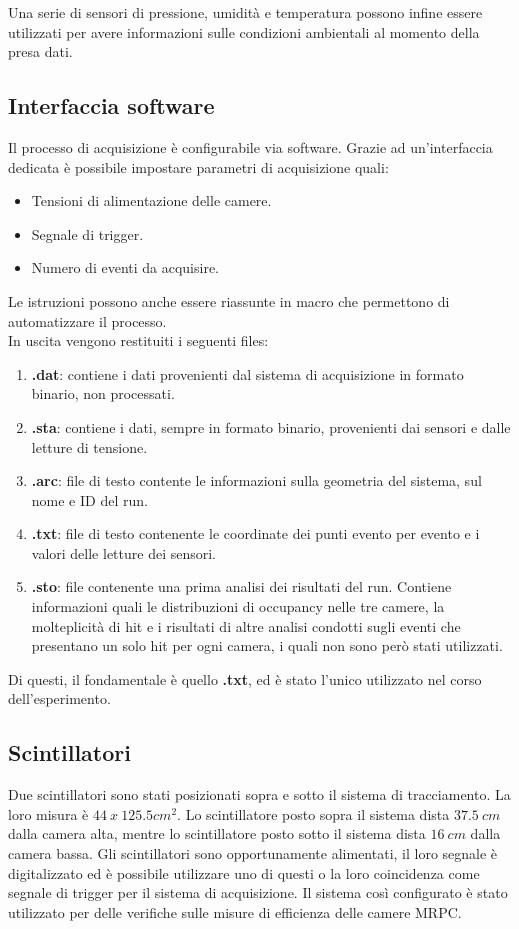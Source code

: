 \documentclass[8pt]{extarticle}
\begin{document}
Una serie di sensori di pressione, umidità e temperatura possono infine essere utilizzati per avere informazioni sulle condizioni ambientali al momento della presa dati.

\subsection{Interfaccia software}
Il processo di acquisizione è configurabile via software. Grazie ad un'interfaccia dedicata è possibile impostare parametri di acquisizione quali: \\
\begin{itemize}
\item Tensioni di alimentazione delle camere.
\item Segnale di trigger.
\item Numero di eventi da acquisire.
\end{itemize}

Le istruzioni possono anche essere riassunte in macro che permettono di automatizzare il processo.\\

In uscita vengono restituiti i seguenti files: \\
\begin{enumerate}
\item \textbf{.dat}: contiene i dati provenienti dal sistema di acquisizione in formato binario, non processati.
\item \textbf{.sta}: contiene i dati, sempre in formato binario, provenienti dai sensori e dalle letture di tensione.
\item \textbf{.arc}: file di testo contente le informazioni sulla geometria del sistema, sul nome e ID del run.
\item \textbf{.txt}: file di testo contenente le coordinate dei punti evento per evento e i valori delle letture dei sensori.
\item \textbf{.sto}: file contenente una prima analisi dei risultati del run. Contiene informazioni quali le distribuzioni di occupancy nelle tre camere, la molteplicità di hit e i risultati di altre analisi condotti sugli eventi che presentano un solo hit per ogni camera, i quali non sono però stati utilizzati.
\end{enumerate}

Di questi, il fondamentale è quello \textbf{.txt}, ed è stato l'unico utilizzato nel corso dell'esperimento.

\subsection{Scintillatori}
Due scintillatori sono stati posizionati sopra e sotto il sistema di tracciamento. La loro misura è $44 \ x \ 125.5 cm^2$. Lo scintillatore posto sopra il sistema dista $37.5 \ cm$ dalla camera alta, mentre lo scintillatore posto sotto il sistema dista $16 \ cm$ dalla camera bassa. Gli scintillatori sono opportunamente alimentati, il loro segnale è digitalizzato ed è possibile utilizzare uno di questi o la loro coincidenza come segnale di trigger per il sistema di acquisizione. Il sistema così configurato è stato utilizzato per delle verifiche sulle misure di efficienza delle camere MRPC.
\end{document}
